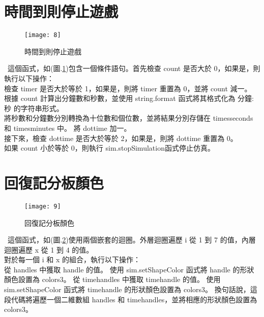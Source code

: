\section{時間到則停止遊戲}
\begin{figure}[htbp!]
\begin{center}
\texttt{[image: 8]}
\caption{\Large 時間到則停止遊戲}\label{時間到則停止遊戲}
\end{center}
\end{figure} 
\
這個函式，如(圖.\ref{時間到則停止遊戲})包含一個條件語句。首先檢查 count 是否大於 0，如果是，則執行以下操作：\\
檢查 timer 是否大於等於 1，如果是，則將 timer 重置為 0，並將 count 減一。\\
根據 count 計算出分鐘數和秒數，並使用 string.format 函式將其格式化為 分鐘:秒 的字符串形式。\\
將秒數和分鐘數分別轉換為十位數和個位數，並將結果分別存儲在 timesseconds 和 timesminutes 中。
將 dottime 加一。\\
接下來，檢查 dottime 是否大於等於 2，如果是，則將 dottime 重置為 0。\\
如果 count 小於等於 0，則執行 sim.stopSimulation函式停止仿真。\\
\section{回復記分板顏色}
\begin{figure}[htbp!]
\begin{center}
\texttt{[image: 9]}
\caption{\Large 回復記分板顏色}\label{回復記分板顏色}
\end{center}
\end{figure} 
\
這個函式，如(圖.\ref{回復記分板顏色})使用兩個嵌套的迴圈。外層迴圈遍歷 i 從 1 到 7 的值，內層迴圈遍歷 x 從 1 到 4 的值。\\
對於每一個 i 和 x 的組合，執行以下操作：\\
從 handles 中獲取 handle 的值。
使用 sim.setShapeColor 函式將 handle 的形狀顏色設置為 colors3。
從 timehandles 中獲取 timehandle 的值。
使用 sim.setShapeColor 函式將 timehandle 的形狀顏色設置為 colors3。
換句話說，這段代碼將遍歷一個二維數組 handles 和 timehandles，並將相應的形狀顏色設置為 colors3。\\
